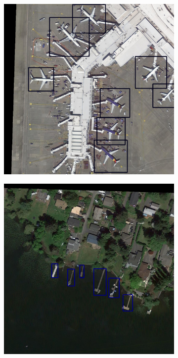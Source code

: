 \documentclass[conference]{IEEEtran}
\begin{document}
\begin{figure}[h!]
\begin{subfigure}[b]{0.4\linewidth}
    	\includegraphics[width=\linewidth]{P0017__1__0___2772.png}
  	\end{subfigure}
  	   	\begin{subfigure}[b]{0.4\linewidth}
    	\includegraphics[width=\linewidth]{P0028__1__924___0.png}

\end{subfigure}
\end{figure}
\end{document}
